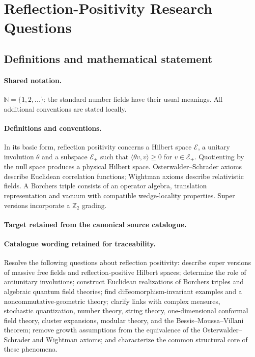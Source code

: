 \documentclass[11pt]{article}
\begin{document}
\section{Reflection-Positivity Research Questions}\label{statement}

\subsection{Definitions and mathematical statement}

\paragraph{Shared notation.}$\mathbb N=\{1,2,\ldots\}$; the standard number fields have their usual meanings. All additional conventions are stated locally.


\paragraph{Definitions and conventions.}
In its basic form, reflection positivity concerns a Hilbert space $\mathcal E$, a unitary involution $\theta$ and a subspace $\mathcal E_+$ such that $\langle\theta v,v\rangle\geq0$ for $v\in\mathcal E_+$. Quotienting by the null space produces a physical Hilbert space. Osterwalder--Schrader axioms describe Euclidean correlation functions; Wightman axioms describe relativistic fields. A Borchers triple consists of an operator algebra, translation representation and vacuum with compatible wedge-locality properties. Super versions incorporate a $\mathbb Z_2$ grading.

\paragraph{Target retained from the canonical source catalogue.}
\paragraph{Catalogue wording retained for traceability.}
Resolve the following questions about reflection positivity: describe super versions of massive free fields and reflection-positive Hilbert spaces; determine the role of antiunitary involutions; construct Euclidean realizations of Borchers triples and algebraic quantum field theories; find diffeomorphism-invariant examples and a noncommutative-geometric theory; clarify links with complex measures, stochastic quantization, number theory, string theory, one-dimensional conformal field theory, cluster expansions, modular theory, and the Bessis–Moussa–Villani theorem; remove growth assumptions from the equivalence of the Osterwalder–Schrader and Wightman axioms; and characterize the common structural core of these phenomena.
\end{document}
